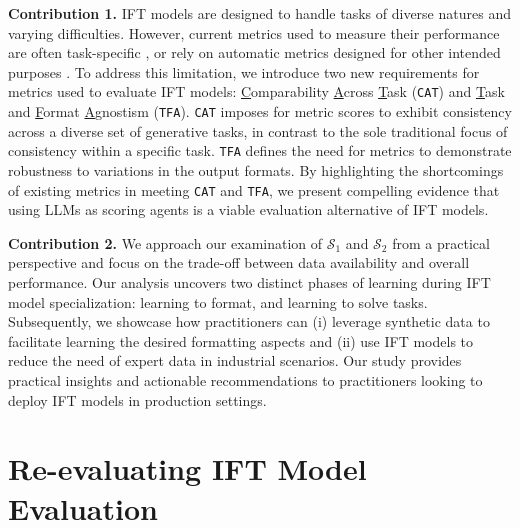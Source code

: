 \noindent\textbf{Contribution 1.} IFT models are designed to handle tasks of diverse natures and varying difficulties. However, current metrics used to measure their performance are often task-specific , or rely on automatic metrics designed for other intended purposes . To address this limitation, we introduce two new requirements for metrics used to evaluate IFT models: \underline{C}omparability \underline{A}cross \underline{T}ask (\texttt{CAT}) and \underline{T}ask and \underline{F}ormat \underline{A}gnostism (\texttt{TFA}). \texttt{CAT} imposes for metric scores to exhibit consistency across a diverse set of generative tasks, in contrast to the sole traditional focus of consistency within a specific task. \texttt{TFA} defines the need for metrics to demonstrate robustness to variations in the output formats. By highlighting the shortcomings of existing metrics in meeting \texttt{CAT} and \texttt{TFA}, we present compelling evidence that using LLMs as scoring agents is a viable evaluation alternative of IFT models. 

\noindent\textbf{Contribution 2.} We approach our examination of $\mathcal{S}_1$ and $\mathcal{S}_2$ from a practical perspective and focus on the trade-off between data availability and overall performance. Our analysis uncovers two distinct phases of learning during IFT model specialization: learning to format, and learning to solve tasks. Subsequently, we showcase how practitioners can (i) leverage synthetic data to facilitate learning the desired formatting aspects and (ii) use IFT models to reduce the need of expert data in industrial scenarios. Our study provides practical insights and actionable recommendations to practitioners looking to deploy IFT models in production settings.

\section{Re-evaluating IFT Model Evaluation}

